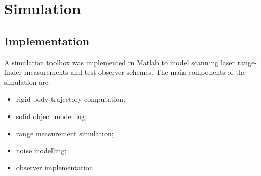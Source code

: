 \chapter{Simulation}
\section{Implementation}
A simulation toolbox was implemented in Matlab to model scanning laser range-finder measurements and test observer schemes. The main components of the simulation are:
\begin{itemize}
\item rigid body trajectory computation;
\item solid object modelling;
\item range measurement simulation;
\item noise modelling;
\item observer implementation.
\end{itemize}

